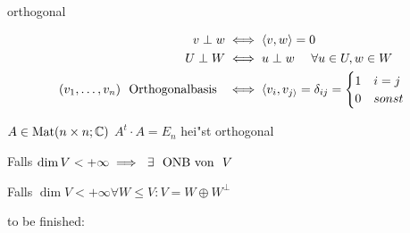 \documentclass[class=article, crop=false]{standalone}
\begin{document}
\begin{zettel}{orthogonal}
\begin{flashcard}
    \begin{definition}
    \begin{align*}
        v \perp w &\iff  \langle v,w\rangle =0\\
        U \perp W &\iff  u \perp w \quad \forall u \in  U, w \in  W\\
        (v_1,\dots,v_n)  \tx{ Orthogonalbasis } &\iff  \langle v_i,v_{j\rangle}= \delta_{i j} = \begin{cases}
            1 & i=j\\
            0 & sonst
        \end{cases}
    \end{align*}
    \end{definition}
\end{flashcard}

\begin{definition}
    $A \in  \operatorname{Mat}(n \times n; \mathbb{C} )$  $A^t \cdot  A = E_n$ hei"st orthogonal
\end{definition}

\begin{corollary}
Falls $\dim V < + \infty \implies \exists \tx{ ONB von } V$
\end{corollary}

\begin{corollary}
Falls $\dim V < + \infty \forall W \leq V : V = W \oplus W^{\perp}$
\end{corollary}


to be finished:

\end{zettel}
\end{document}

